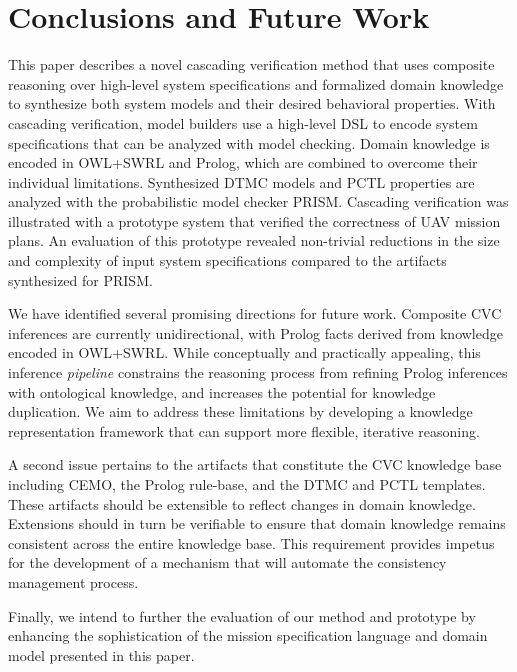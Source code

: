 \section{Conclusions and Future Work}
\label{sec:Conclusions_and_Future_Work}

\noindent This paper describes a novel cascading verification method that uses composite reasoning over high-level system specifications and formalized domain knowledge to synthesize both system models and their desired behavioral properties. With cascading verification, model builders use a high-level DSL to encode system specifications that can be analyzed with model checking. Domain knowledge is encoded in OWL+SWRL and Prolog, which are combined to overcome their individual limitations. Synthesized DTMC models and PCTL properties are analyzed with the probabilistic model checker PRISM\@. Cascading verification was illustrated with a prototype system that verified the correctness of UAV mission plans. An evaluation of this prototype revealed non-trivial reductions in the size and complexity of input system specifications compared to the artifacts synthesized for PRISM\@.

We have identified several promising directions for future work. Composite CVC inferences are currently unidirectional, with Prolog facts derived from knowledge encoded in OWL+SWRL\@. While conceptually and practically appealing, this inference \emph{pipeline} constrains the reasoning process from refining Prolog inferences with ontological knowledge, and increases the potential for knowledge duplication. We aim to address these limitations by developing a knowledge representation framework that can support more flexible, iterative reasoning.

A second issue pertains to the artifacts that constitute the CVC knowledge base including CEMO, the Prolog rule-base, and the DTMC and PCTL templates. These artifacts should be extensible to reflect changes in domain knowledge. Extensions should in turn be verifiable to ensure that domain knowledge remains consistent across the entire knowledge base. This requirement provides impetus for the development of a mechanism that will automate the consistency management process.

Finally, we intend to further the evaluation of our method and prototype by enhancing the sophistication of the mission specification language and domain model presented in this paper.
